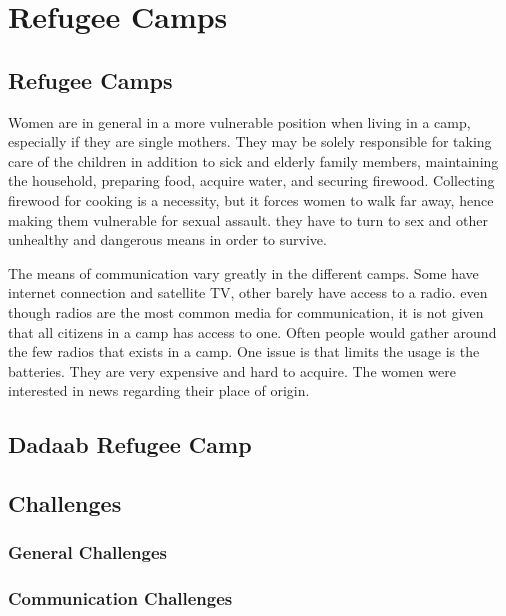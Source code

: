 \chapter{Refugee Camps}
\label{chp:refugeecamps} 

\section{Refugee Camps}

Women are in general in a more vulnerable position when living in a  camp, especially if they are single mothers. They may be solely responsible for taking care of the children in addition to sick and elderly family members, maintaining the household, preparing food, acquire water, and securing firewood. Collecting firewood for cooking is a necessity, but it forces women  to walk far away, hence making them vulnerable for sexual assault. they have to turn to sex and other unhealthy and dangerous means in order to survive. \cite{womenRefugee} 


The means of communication vary greatly in the different camps. Some have internet connection and satellite TV, other barely have access to a radio. even though radios are the most common media for communication, it is not given that all citizens in a camp has access to one. Often people would gather around the few radios that exists in a camp. One issue is that limits the usage is the batteries. They are very expensive and hard to acquire. The women were interested in news regarding their place of origin.   \cite{womenRefugee}  



\section{Dadaab Refugee Camp}

\section{Challenges}

\subsection{General Challenges}

\subsection{Communication Challenges}

